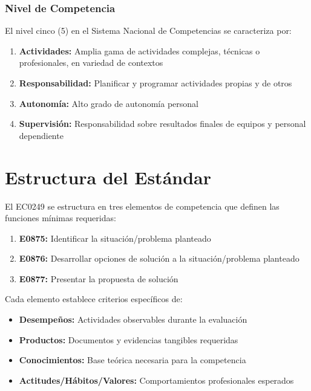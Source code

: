 \documentclass[12pt,letterpaper,oneside]{book}
\begin{document}
\subsubsection{Nivel de Competencia}

El nivel cinco (5) en el Sistema Nacional de Competencias se caracteriza por:

\begin{enumerate}
\item \textbf{Actividades:} Amplia gama de actividades complejas, técnicas o profesionales, en variedad de contextos
\item \textbf{Responsabilidad:} Planificar y programar actividades propias y de otros
\item \textbf{Autonomía:} Alto grado de autonomía personal
\item \textbf{Supervisión:} Responsabilidad sobre resultados finales de equipos y personal dependiente
\end{enumerate}

\section{Estructura del Estándar}

El EC0249 se estructura en tres elementos de competencia que definen las funciones mínimas requeridas:

\begin{enumerate}
\item \textbf{E0875:} Identificar la situación/problema planteado
\item \textbf{E0876:} Desarrollar opciones de solución a la situación/problema planteado
\item \textbf{E0877:} Presentar la propuesta de solución
\end{enumerate}

Cada elemento establece criterios específicos de:
\begin{itemize}
\item \textbf{Desempeños:} Actividades observables durante la evaluación
\item \textbf{Productos:} Documentos y evidencias tangibles requeridas
\item \textbf{Conocimientos:} Base teórica necesaria para la competencia
\item \textbf{Actitudes/Hábitos/Valores:} Comportamientos profesionales esperados
\end{itemize}

\end{document}
